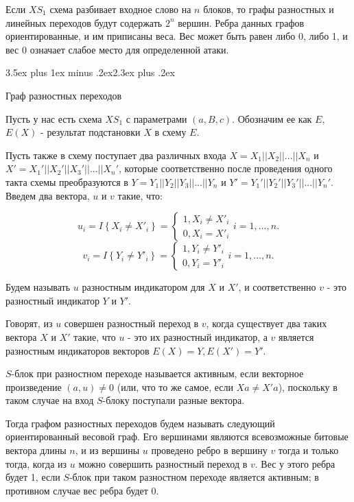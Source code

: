\documentclass[a4paper,12pt]{report}
\makeatletter
\theoremstyle{plain} %
\theoremstyle{definition}
\theoremstyle{remark}
\renewcommand{\section}{\@startsection{section}{1}{18pt}%
{3.5ex plus 1ex minus .2ex}{2.3ex plus .2ex}%
{\normalfont\Large\bfseries\raggedright}}%
\makeatother
\begin{document}
\begin{large}
Если $XS_1$ схема разбивает входное слово на $n$ блоков, то графы разностных и линейных переходов будут содержать $2^n$ вершин. Ребра данных графов ориентированные, и им приписаны веса. Вес может быть равен либо 0, либо 1, и вес 0 означает слабое место для определенной атаки.

\section{Граф разностных переходов}

Пусть у нас есть схема $XS_1$ с параметрами $(a, B, c)$. Обозначим ее как $E$,  $E(X)$ - результат подстановки $X$ в схему $E$. 

Пусть также в схему поступает два различных входа $X=X_1||X_2||...||X_n$ и $X'=X_1'||X_2'||X_3'||...||X_n'$, которые соответственно после проведения одного такта схемы преобразуются в $Y=Y_1||Y_2||Y_3||...||Y_n$ и $Y'=Y_1'||Y_2'||Y_3'||...||Y_n'$. Введем два вектора, $u$ и $v$ такие, что:

\begin{equation}
u_i=I\left\{X_i\ne X'_i\right\}=\left\{ \begin{array}{c}
1,X_i\ne X'_i \\
0,X_i=X'_i \end{array}
\right.i=1,\dots , n.
\end{equation}
\begin{equation}
v_i=I\left\{Y_i\ne Y'_i\right\}=\left\{ \begin{array}{c}
1,Y_i\ne Y'_i \\
0,Y_i=Y'_i \end{array}
\right.i=1,\dots , n.
\end{equation}

Будем называть $u$ разностным индикатором для $X$ и $X'$, и соответственно $v$ - это разностный индикатор $Y$ и $Y'$.

Говорят, из $u$ совершен разностный переход в $v$, когда существует два таких вектора $X$ и $X'$ такие, что $u$ - это их разностный индикатор, а $v$ является разностным индикаторов векторов $E(X) = Y, E(X') = Y'$.

$S$-блок при разностном переходе называется активным, если векторное произведение $(a, u) \neq 0$ (или, что то же самое, если $Xa \neq X'a$), поскольку в таком случае на вход $S$-блоку поступали разные вектора.

Тогда графом разностных переходов будем называть следующий ориентированный весовой граф. Его вершинами являются всевозможные битовые вектора длины $n$, и из вершины $u$ проведено ребро в вершину $v$ тогда и только тогда, когда из $u$ можно совершить разностный переход в $v$. Вес у этого ребра будет 1, если $S$-блок при таком разностном переходе является активным; в противном случае вес ребра будет 0.


\end{large}
\end{document}
